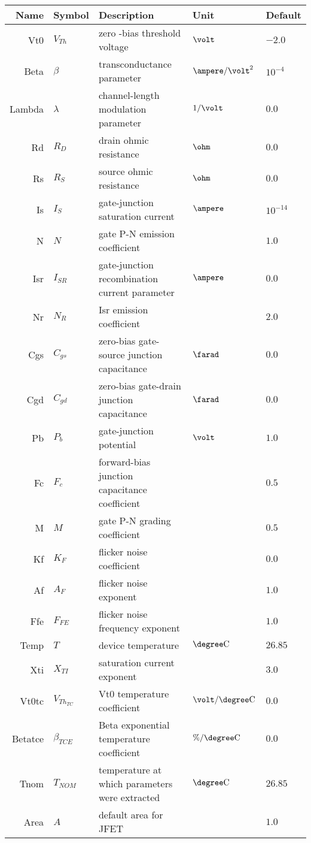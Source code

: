 \begin{longtable}{rllll}
Name & Symbol & Description & Unit & Default\\
\hline
\endhead
Vt0 & $V_{Th}$ & zero -bias threshold voltage & $\volt$ & $-2.0$\\
Beta & $\beta$ & transconductance parameter & $\ampere / \volt^{2}$ & $10^{-4}$\\
Lambda & $\lambda$ & channel-length modulation parameter & $1/\volt$ & $0.0$\\
Rd & $R_{D}$ & drain ohmic resistance & $\ohm$ & $0.0$\\
Rs & $R_{S}$ & source ohmic resistance & $\ohm$ & $0.0$\\
Is & $I_{S}$ & gate-junction saturation current & $\ampere$ & $10^{-14}$\\
N & $N$ & gate P-N emission coefficient & & $1.0$\\
Isr & $I_{SR}$ & gate-junction recombination current parameter & $\ampere$ & $0.0$\\
Nr & $N_{R}$ & Isr emission coefficient & & $2.0$\\
Cgs & $C_{gs}$ & zero-bias gate-source junction capacitance & $\farad$ & $0.0$\\
Cgd & $C_{gd}$ & zero-bias gate-drain junction capacitance & $\farad$ & $0.0$\\
Pb & $P_{b}$ & gate-junction potential & $\volt$ & $1.0$\\
Fc & $F_{c}$ & forward-bias junction capacitance coefficient & & $0.5$\\
M & $M$ & gate P-N grading coefficient & & $0.5$\\
Kf & $K_F$ & flicker noise coefficient & & $0.0$\\
Af & $A_F$ & flicker noise exponent & & $1.0$\\
Ffe & $F_{FE}$ & flicker noise frequency exponent & & $1.0$\\
Temp & $T$ & device temperature & $\degree \mathrm{C}$ & $26.85$\\
Xti & $X_{TI}$ & saturation current exponent & & $3.0$\\
Vt0tc & $V_{Th_{TC}}$ & Vt0 temperature coefficient & $\volt/\degree \mathrm{C}$ & $0.0$\\
Betatce & $\beta_{TCE}$ & Beta exponential temperature coefficient & $\%/\degree \mathrm{C}$ & $0.0$\\
Tnom & $T_{NOM}$ & temperature at which parameters were extracted & $\degree \mathrm{C}$ & $26.85$\\
Area & $A$ & default area for JFET & & $1.0$
\end{longtable}

